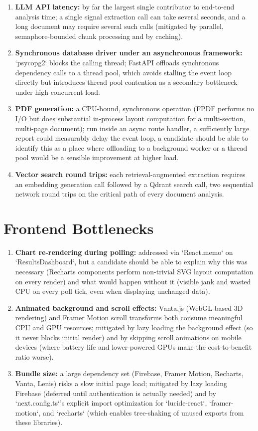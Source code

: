 \documentclass[11pt,a4paper]{report}
\begin{document}
\begin{enumerate}[leftmargin=*]
  \item \textbf{LLM API latency:} by far the largest single contributor to end-to-end analysis time; a single signal extraction call can take several seconds, and a long document may require several such calls (mitigated by parallel, semaphore-bounded chunk processing and by caching).
  \item \textbf{Synchronous database driver under an asynchronous framework:} `psycopg2` blocks the calling thread; FastAPI offloads synchronous dependency calls to a thread pool, which avoids stalling the event loop directly but introduces thread pool contention as a secondary bottleneck under high concurrent load.
  \item \textbf{PDF generation:} a CPU-bound, synchronous operation (FPDF performs no I/O but does substantial in-process layout computation for a multi-section, multi-page document); run inside an async route handler, a sufficiently large report could measurably delay the event loop, a candidate should be able to identify this as a place where offloading to a background worker or a thread pool would be a sensible improvement at higher load.
  \item \textbf{Vector search round trips:} each retrieval-augmented extraction requires an embedding generation call followed by a Qdrant search call, two sequential network round trips on the critical path of every document analysis.
\end{enumerate}

\section{Frontend Bottlenecks}

\begin{enumerate}[leftmargin=*]
  \item \textbf{Chart re-rendering during polling:} addressed via `React.memo` on `ResultsDashboard`, but a candidate should be able to explain why this was necessary (Recharts components perform non-trivial SVG layout computation on every render) and what would happen without it (visible jank and wasted CPU on every poll tick, even when displaying unchanged data).
  \item \textbf{Animated background and scroll effects:} Vanta.js (WebGL-based 3D rendering) and Framer Motion scroll transforms both consume meaningful CPU and GPU resources; mitigated by lazy loading the background effect (so it never blocks initial render) and by skipping scroll animations on mobile devices (where battery life and lower-powered GPUs make the cost-to-benefit ratio worse).
  \item \textbf{Bundle size:} a large dependency set (Firebase, Framer Motion, Recharts, Vanta, Lenis) risks a slow initial page load; mitigated by lazy loading Firebase (deferred until authentication is actually needed) and by `next.config.ts`'s explicit import optimization for `lucide-react`, `framer-motion`, and `recharts` (which enables tree-shaking of unused exports from these libraries).
\end{enumerate}
\end{document}
